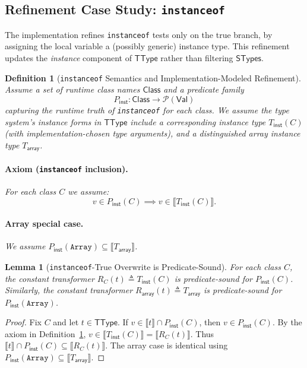 \documentclass[11pt]{article}
\newtheorem{lemma}[theorem]{Lemma}
\newtheorem{definition}[theorem]{Definition}
\newcommand{\sem}[1]{\llbracket #1 \rrbracket}
\newcommand{\Pred}{\mathcal{P}(\Val)}
\newcommand{\TType}{\mathsf{TType}}
\newcommand{\STypes}{\mathsf{STypes}}
\newcommand{\Val}{\mathsf{Val}}
\begin{document}
\subsection{Refinement Case Study: \texttt{instanceof}}

The implementation refines \texttt{instanceof} tests only on the true branch, by assigning the local variable a (possibly generic) instance type.
This refinement updates the \emph{instance} component of $\TType$ rather than filtering $\STypes$.

\begin{definition}[\texttt{instanceof} Semantics and Implementation-Modeled Refinement]
\label{def:instanceof-semantics}
Assume a set of runtime class names $\mathsf{Class}$ and a predicate family
\[
P_{\mathsf{inst}} : \mathsf{Class} \to \Pred
\]
capturing the runtime truth of \texttt{instanceof} for each class.
We assume the type system's instance forms in $\TType$ include a corresponding instance type $T_{\mathsf{inst}}(C)$ (with implementation-chosen type arguments), and a distinguished array instance type $T_{\mathsf{array}}$.

\paragraph{Axiom (\texttt{instanceof} inclusion).}
For each class $C$ we assume:
\[
v \in P_{\mathsf{inst}}(C) \implies v \in \sem{T_{\mathsf{inst}}(C)}.
\]
\paragraph{Array special case.}
We assume $P_{\mathsf{inst}}(\texttt{Array}) \subseteq \sem{T_{\mathsf{array}}}$.
\end{definition}

\begin{lemma}[\texttt{instanceof}-True Overwrite is Predicate-Sound]
\label{lem:instanceof-predicate-sound}
For each class $C$, the constant transformer $R_C(t)\triangleq T_{\mathsf{inst}}(C)$ is predicate-sound for $P_{\mathsf{inst}}(C)$.
Similarly, the constant transformer $R_{\mathsf{array}}(t)\triangleq T_{\mathsf{array}}$ is predicate-sound for $P_{\mathsf{inst}}(\texttt{Array})$.
\end{lemma}

\begin{proof}
Fix $C$ and let $t \in \TType$.
If $v \in \sem{t}\cap P_{\mathsf{inst}}(C)$, then $v \in P_{\mathsf{inst}}(C)$.
By the axiom in Definition~\ref{def:instanceof-semantics}, $v \in \sem{T_{\mathsf{inst}}(C)} = \sem{R_C(t)}$.
Thus $\sem{t}\cap P_{\mathsf{inst}}(C) \subseteq \sem{R_C(t)}$.
The array case is identical using $P_{\mathsf{inst}}(\texttt{Array}) \subseteq \sem{T_{\mathsf{array}}}$.
\end{proof}
\end{document}
